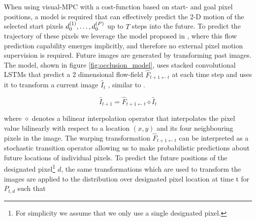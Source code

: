 When using visual-MPC with a cost-function based on start- and goal pixel positions, a model is required that can effectively predict the 2-D motion of the selected start pixels $d_0^{(1)}, \dots, d_0^{(P)}$ up to $T$ steps into the future.
To predict the trajectory of these pixels we leverage the model proposed in \cite{finn_nips},
where this flow prediction capability emerges implicitly, and therefore no external pixel motion supervision is required. Future images are generated by transforming past images. The model, shown in figure \ref{fig:occlusion_model}, uses stacked convolutional LSTMs that predict a 2 dimensional flow-field $\hat{F}_{t+1 \leftarrow t}$ at each time step and uses it to transform a current image $\hat{I}_t$ , similar to \cite{zhou2016view}.


\begin{equation}
\hat{I}_{t+1} = \hat{F}_{t+1 \leftarrow t} \diamond  \hat{I}_t 
\label{simple_dna}
\end{equation}

where $\diamond$ denotes a bilinear interpolation operator that interpolates the pixel value bilinearly with respect to a location $(x,y)$ and its four neighbouring pixels in the image. The warping transformation $\hat{F}_{t+1 \leftarrow t}$ can be interpreted as a stochastic transition operator allowing us to make probabilistic predictions about future locations of individual pixels. To predict the future positions of the designated pixel\footnote{For simplicity we assume that we only use a single designated pixel.}
$d$, the same transformations which are used to transform the images are applied to the distribution over designated pixel location
at time t for $P_{t,d}$ such that
 
